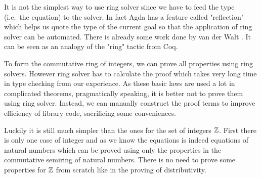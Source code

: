 It is not the simplest way to use ring solver since we have to feed
the type (i.e.\ the equation) to the solver. In fact Agda has a feature called "reflection" which helps us quote the type of the current goal so that the application of ring solver can be automated. There is already some work
done by van der Walt \cite{van2012reflection}. It can be seen as an
analogy of the "ring" tactic from Coq.

To form the commutative ring of integers, we can prove all properties using ring solvers. However ring solver has to calculate the proof which takes very long time in type checking from our experience. As
these basic laws are used a lot in complicated theorems, pragmatically speaking, it is better not to prove them using ring solver.
Instead, we can manually construct the proof terms to improve efficiency of library
code, sacrificing some conveniences.

Luckily it is still much simpler than the ones for the set of integers $\mathbb{Z}$.
First there is only one case of integer and as we know the equations is
indeed equations of natural numbers which can be proved using only the
properties in the commutative semiring of natural numbers. There is no
need to prove some properties for $\mathbb{Z}$ from scratch like in the
proving of distributivity.

